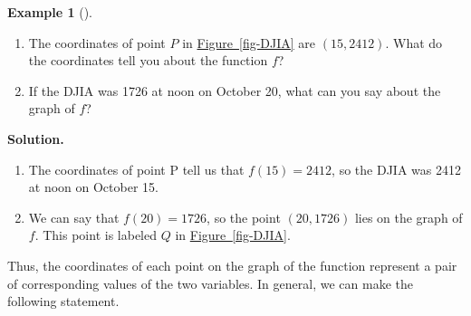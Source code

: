 \documentclass[10pt,]{book}
\theoremstyle{plain}
\theoremstyle{definition}
\theoremstyle{definition}
\newtheorem{example}[theorem]{Example}
\begin{document}
\begin{example}[]\label{example-DJIA}
\leavevmode%
\begin{enumerate}[label=*\alph**]
\item\hypertarget{li-1}{}The coordinates of point \(P\) in \hyperref[fig-DJIA]{Figure~\ref{fig-DJIA}} are \((15, 2412)\). What do the coordinates tell you about the function \(f\)?\item\hypertarget{li-2}{}If the DJIA was 1726 at noon on October 20, what can you say about the graph of \(f\)?\end{enumerate}
\par\medskip\noindent%
\textbf{Solution.}\quad \leavevmode%
\begin{enumerate}[label=*\alph**]
\item\hypertarget{li-3}{}The coordinates of point P tell us that \(f(15) = 2412\), so the DJIA was 2412 at noon on October 15.\item\hypertarget{li-4}{}We can say that \(f(20) = 1726\), so the point \((20, 1726)\) lies on the graph of \(f\). This point is labeled \(Q\) in \hyperref[fig-DJIA]{Figure~\ref{fig-DJIA}}.\end{enumerate}
\end{example}
\par
Thus, the coordinates of each point on the graph of the function represent a pair of corresponding
values of the two variables. In general, we can make the following statement.%
\typeout{************************************************}
\typeout{************************************************}
\end{document}
